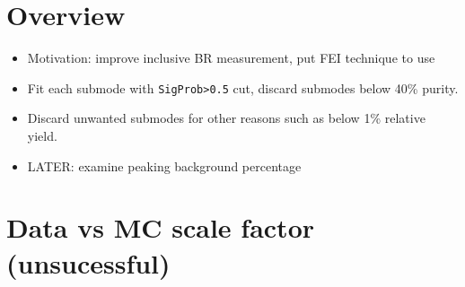 \documentclass{article}
\begin{document}
\tableofcontents
\newpage
\section*{Overview}
\begin{itemize}
\item Motivation: improve inclusive BR measurement, put FEI technique to use
\item Fit each submode with \verb+SigProb>0.5+ cut, discard submodes below 40\% purity.
\item Discard unwanted submodes for other reasons such as below 1\% relative yield.
\item LATER: examine peaking background percentage
\end{itemize}

\newpage
\section{Data vs MC scale factor (unsucessful)}
\end{document}
